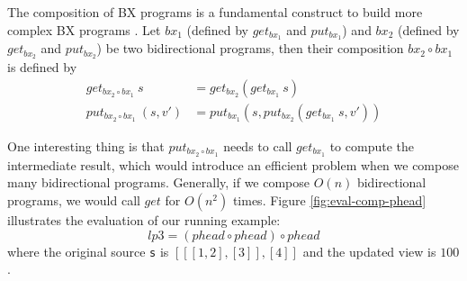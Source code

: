 The composition of BX programs is a fundamental construct to build more complex BX programs \cite{Bohannon06relationallenses:, Bohannon:2008:BRL:1328438.1328487}. Let $bx_1$ (defined by $get_{bx_1}$ and $put_{bx_1}$) and $bx_2$ (defined by $get_{bx_2}$ and $put_{bx_2}$) be two bidirectional programs, then their composition $bx_2 \circ bx_1$ is defined by
\begin{align}
get_{bx_2 \circ bx_1}~s &= get_{bx_2} (get_{bx_1}~s)\\
put_{bx_2 \circ bx_1}~(s,v') &= put_{bx_1} (s,put_{bx_2} (get_{bx_1}~s,v'))
\end{align}





One interesting thing is that $put_{bx_2 \circ bx_1}$ needs to call $get_{bx_1}$ to compute the intermediate result, which would introduce an efficient problem when we compose many bidirectional programs. Generally, if we compose $O(n)$ bidirectional programs, we would call $get$ for $O(n^2)$ times. Figure \ref{fig:eval-comp-phead} illustrates the evaluation of our running example:
\[
lp3 = (phead \circ phead) \circ phead
\]
where the original source \texttt{s} is ${[[[1,2],[3]],[4]]}$ and the updated view is ${100}$.

